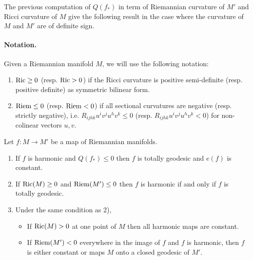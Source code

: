 The previous computation of \(Q(f_*)\) in term of Riemannian curvature of \(M'\) and
Ricci curvature of \(M\) give the following result in the case where the curvature of \(M\) and \(M'\) are of definite sign.

\paragraph{Notation.}
\label{sec:orgef3c269}
Given a Riemannian manifold \(M\), we will use the following notation:
\begin{enumerate}
\item \({\rm Ric} \geq 0\) (resp. \({\rm Ric} > 0\)) if the Ricci curvature is positive
semi-definite (resp. positive definite) as symmetric bilinear form.
\item \({\rm Riem} \leq 0\) (resp. \({\rm Riem} < 0\)) if all sectional curvatures are
negative (resp. strictly negative), i.e. \(R_{ijhk} u^i v^j
   u^h v^k \leq 0\) (resp. \(R_{ijhk} u^i v^j
   u^h v^k < 0\)) for non-colinear vectors \(u,v\).
\end{enumerate}

\begin{corollary}
\label{cor:signed-curvature}
Let \(f: M \longrightarrow M'\) be a map of Riemannian manifolds.
\begin{enumerate}
\item If \(f\) is harmonic and \(Q(f_*) \leq 0\) then \(f\) is totally geodesic and \(e(f)\) is constant.
\item If \({\rm Ric}(M) \geq 0\) and \({\rm Riem}(M')\leq 0\) then \(f\) is harmonic if
and only if \(f\) is totally geodesic.
\item Under the same condition as 2),
\begin{itemize}
\item If \({\rm Ric}(M) >0\) at one point of \(M\) then all harmonic maps are constant.
\item If \({\rm Riem}(M') <0\) everywhere in the image of \(f\) and \(f\) is
harmonic, then \(f\) is either constant or maps \(M\) onto a closed geodesic of \(M'\).
\end{itemize}
\end{enumerate}
\end{corollary}

